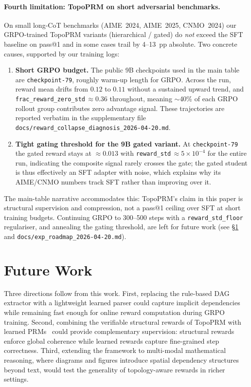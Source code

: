 \paragraph{Fourth limitation: TopoPRM on short adversarial benchmarks.}
On small long-CoT benchmarks (AIME~2024, AIME~2025, CNMO~2024) our
GRPO-trained TopoPRM variants (hierarchical / gated) do \emph{not}
exceed the SFT baseline on pass@1 and in some cases trail by 4--13~pp
absolute. Two concrete causes, supported by our training logs:
\begin{enumerate}[leftmargin=*,itemsep=1pt]
\item \textbf{Short GRPO budget.} The public 9B checkpoints used in the
main table are \texttt{checkpoint-79}, roughly warm-up length for GRPO.
Across the run, reward mean drifts from $0.12$ to $0.11$ without a
sustained upward trend, and \texttt{frac\_reward\_zero\_std}\,$\approx\!0.36$
throughout, meaning $\sim$40\% of each GRPO rollout group contributes
zero advantage signal. These trajectories are reported verbatim in the
supplementary file \texttt{docs/reward\_collapse\_diagnosis\_2026-04-20.md}.
\item \textbf{Tight gating threshold for the 9B gated variant.} At
\texttt{checkpoint-79} the gated reward stays at $\approx\!0.013$ with
\texttt{reward\_std}\,$\approx\!5{\times}10^{-4}$ for the entire run, indicating the
composite signal rarely crosses the gate; the gated student is thus
effectively an SFT adapter with noise, which explains why its AIME/CNMO
numbers track SFT rather than improving over it.
\end{enumerate}
The main-table narrative accommodates this: TopoPRM's claim in this
paper is structural supervision and compression, not a pass@1 ceiling
over SFT at short training budgets. Continuing GRPO to 300--500 steps
with a \texttt{reward\_std\_floor} regulariser, and annealing the gating
threshold, are left for future work
(see \S\ref{app:future} and \texttt{docs/exp\_roadmap\_2026-04-20.md}).

\section{Future Work}
\label{app:future}

Three directions follow from this work. First, replacing the rule-based
DAG extractor with a lightweight learned parser could capture implicit
dependencies while remaining fast enough for online reward computation
during GRPO training. Second, combining the verifiable structural rewards
of TopoPRM with learned PRMs~\citep{lightman2023lets} could provide
complementary supervision: structural rewards enforce global coherence
while learned rewards capture fine-grained step correctness. Third,
extending the framework to multi-modal mathematical reasoning, where
diagrams and figures introduce spatial dependency structures beyond text,
would test the generality of topology-aware rewards in richer settings.

